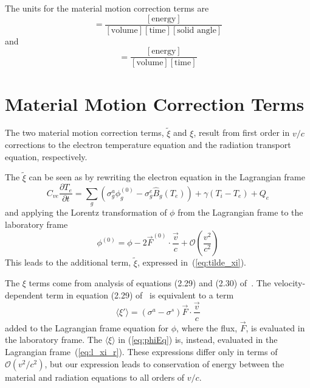 \documentclass{article}
\newcommand{\partl}[2]{\ensuremath{\frac{\partial{#1}}{\partial{#2}}}}\newcommand{\del}{\ensuremath{\vec{\nabla}}}
\newcommand{\Bg}{\ensuremath{\hat{B}_{g}}}
\newcommand{\units}[1]{\ensuremath{[\mbox{#1}]}}
\begin{document}
The units for the material motion correction terms are
\begin{equation}
        [\xi] = \frac{\units{energy}}
                     {\units{volume} \units{time} \units{solid angle}}
\end{equation}
and
\begin{equation}
        [\tilde{\xi}] = \frac{\units{energy}}
                             {\units{volume} \units{time}}
\end{equation}

\section{Material Motion Correction Terms}

The two material motion correction terms, $\tilde{\xi}$ and $\xi$, result
from first order in $v/c$ corrections to the electron temperature equation
and the radiation transport equation, respectively.

The $\tilde{\xi}$ can be seen as by rewriting the electron equation in
the Lagrangian frame
\begin{equation}
        C_{ve} \partl{T_{e}}{t} = 
                \sum_{g} \left(
                        \sigma_{g}^{a} \phi^{(0)}_{g}
                        - \sigma_{g}^{e} \Bg(T_{e}) \right)
                        + \gamma (T_{i} - T_{e}) + Q_{e}
\end{equation}
and applying the Lorentz transformation of $\phi$ from the Lagrangian frame
to the laboratory frame~\cite[page 417]{MihalasMihalas}
\begin{equation}
        \phi^{(0)} = \phi - 2 \vec{F}^{(0)} \cdot \frac{\vec{v}}{c} 
                 + \mathcal{O}(\frac{v^2}{c^2})
\end{equation}
This leads to the additional term, $\tilde{\xi}$,
expressed in~(\ref{eq:tilde_xi}).

The $\xi$ terms come from analysis of equations (2.29) and (2.30)
of~\cite{MihalasKlein}.
The velocity-dependent term in equation (2.29) of~\cite{MihalasKlein}
is equivalent to a term
\begin{equation}
        \langle \xi' \rangle = (\sigma^{a} - \sigma^{s}) \vec{F}
                        \cdot \frac{\vec{v}}{c}
\end{equation}
added to the Lagrangian frame equation for $\phi$,
where the flux, $\vec{F}$, is evaluated in the laboratory frame.
The $\langle \xi \rangle$ in (\ref{eq:phiEq}) is, instead, evaluated in the
Lagrangian frame~(\ref{eq:l_xi_r}).
These expressions differ only in terms of $\mathcal{O}(v^2/c^2)$,
but our expression
leads to conservation of energy between the material and radiation equations
to all orders of $v/c$.
\end{document}

